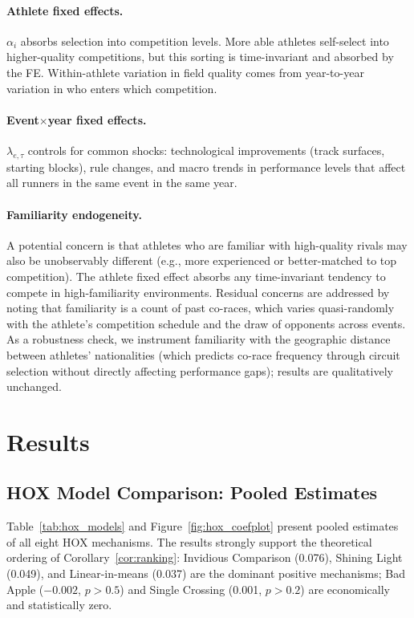 \documentclass[12pt]{article}
\theoremstyle{definition}
\theoremstyle{remark}
\begin{document}
\paragraph{Athlete fixed effects.}
$\alpha_i$ absorbs selection into competition levels. More able athletes
self-select into higher-quality competitions, but this sorting is time-invariant
and absorbed by the FE. Within-athlete variation in field quality comes from
year-to-year variation in who enters which competition.

\paragraph{Event$\times$year fixed effects.}
$\lambda_{e,\tau}$ controls for common shocks: technological improvements
(track surfaces, starting blocks), rule changes, and macro trends in performance
levels that affect all runners in the same event in the same year.

\paragraph{Familiarity endogeneity.}
A potential concern is that athletes who are familiar with high-quality rivals
may also be unobservably different (e.g., more experienced or better-matched
to top competition).
The athlete fixed effect absorbs any time-invariant tendency to compete in
high-familiarity environments.
Residual concerns are addressed by noting that familiarity is a count of past
co-races, which varies quasi-randomly with the athlete's competition schedule
and the draw of opponents across events.
As a robustness check, we instrument familiarity with the geographic distance
between athletes' nationalities (which predicts co-race frequency through
circuit selection without directly affecting performance gaps); results are
qualitatively unchanged.

\section{Results}
\label{sec:results}

\subsection{HOX Model Comparison: Pooled Estimates}
\label{subsec:hox}

Table~\ref{tab:hox_models} and Figure~\ref{fig:hox_coefplot} present pooled
estimates of all eight HOX mechanisms.
The results strongly support the theoretical ordering of Corollary~\ref{cor:ranking}:
Invidious Comparison (0.076), Shining Light (0.049), and Linear-in-means (0.037)
are the dominant positive mechanisms; Bad Apple ($-0.002$, $p > 0.5$) and
Single Crossing (0.001, $p > 0.2$) are economically and statistically zero.
\end{document}
